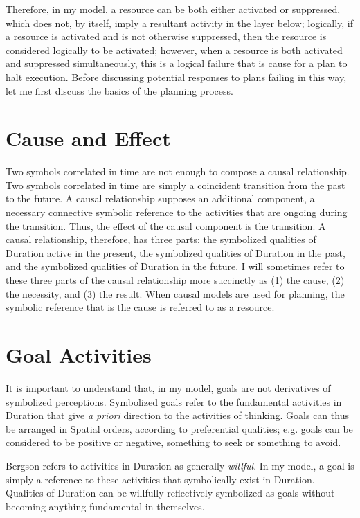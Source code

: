 Therefore, in my model, a resource can be both either activated or
suppressed, which does not, by itself, imply a resultant activity in
the layer below; logically, if a resource is activated and is not
otherwise suppressed, then the resource is considered logically to be
activated; however, when a resource is both activated and suppressed
simultaneously, this is a logical failure that is cause for a plan to
halt execution.  Before discussing potential responses to plans
failing in this way, let me first discuss the basics of the planning
process.

\section{Cause and Effect}

Two symbols correlated in time are not enough to compose a causal
relationship.  Two symbols correlated in time are simply a coincident
transition from the past to the future.  A causal relationship
supposes an additional component, a necessary connective symbolic
reference to the activities that are ongoing during the transition.
Thus, the effect of the causal component is the transition.  A causal
relationship, therefore, has three parts: the symbolized qualities of
Duration active in the present, the symbolized qualities of Duration
in the past, and the symbolized qualities of Duration in the future.
I will sometimes refer to these three parts of the causal relationship
more succinctly as (1) the cause, (2) the necessity, and (3) the
result.  When causal models are used for planning, the symbolic
reference that is the cause is referred to as a resource.

\section{Goal Activities}

It is important to understand that, in my model, goals are not
derivatives of symbolized perceptions.  Symbolized goals refer to the
fundamental activities in Duration that give \emph{a priori} direction
to the activities of thinking.  Goals can thus be arranged in Spatial
orders, according to preferential qualities; e.g. goals can be
considered to be positive or negative, something to seek or something
to avoid.

Bergson refers to activities in Duration as generally \emph{willful}.
In my model, a goal is simply a reference to these activities that
symbolically exist in Duration.  Qualities of Duration can be
willfully reflectively symbolized as goals without becoming anything
fundamental in themselves.

